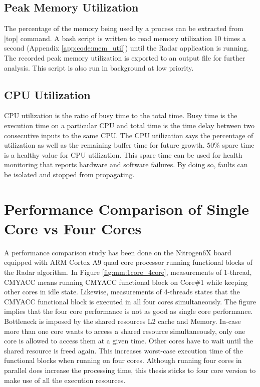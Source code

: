 \subsection{Peak Memory Utilization}
\label{ss:mm:mem_util}
The percentage of the memory being used by a process can be extracted from \bverb|top| command. A bash script is written to read memory utilization 10 times a second (Appendix \ref{app:code:mem_util}) until the Radar application is running. The recorded peak memory utilization is exported to an output file for further analysis. This script is also run in background at low priority.

\subsection{CPU Utilization}
\label{ss:mm:cpu_load}
CPU utilization is the ratio of busy time to the total time. Busy time is the execution time on a particular CPU and total time is the time delay between two consecutive inputs to the same CPU. The CPU utilization says the percentage of utilization as well as the remaining buffer time for future growth. 50\% spare time is a healthy value for CPU utilization. This spare time can be used for health monitoring that reports hardware and software failures. By doing so, faults can be isolated and stopped from propagating.

\section{Performance Comparison of Single Core vs Four Cores}
\label{sec:mm:perf_comp}
A performance comparison study has been done on the Nitrogen6X board equipped with ARM Cortex A9 quad core processor running functional blocks of the Radar algorithm. In Figure \ref{fig:mm:1core_4core}, measurements of 1-thread, CMYACC means running CMYACC functional block on Core\#1 while keeping other cores in idle state. Likewise, measurements of 4-threads states that the CMYACC functional block is executed in all four cores simultaneously. The figure implies that the four core performance is not as good as single core performance. Bottleneck is imposed by the shared resources L2 cache and Memory. In-case more than one core wants to access a shared resource simultaneously, only one core is allowed to access them at a given time. Other cores have to wait until the shared resource is freed again. This increases worst-case execution time of the functional blocks when running on four cores. Although running four cores in parallel does increase the processing time, this thesis sticks to four core version to make use of all the execution resources.

